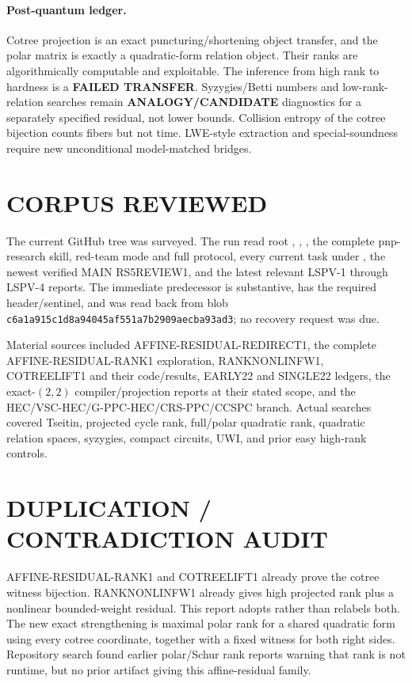 \documentclass[11pt]{article}
\begin{document}
\paragraph{Post-quantum ledger.}
Cotree projection is an exact puncturing/shortening object transfer, and the
polar matrix is exactly a quadratic-form relation object.  Their ranks are
algorithmically computable and exploitable.  The inference from high rank to
hardness is a \textbf{FAILED TRANSFER}.  Syzygies/Betti numbers and
low-rank-relation searches remain \textbf{ANALOGY/CANDIDATE} diagnostics for
a separately specified residual, not lower bounds.  Collision entropy of the
cotree bijection counts fibers but not time.  LWE-style extraction and
special-soundness require new unconditional model-matched bridges.

\section{CORPUS REVIEWED}
The current GitHub tree was surveyed.  The run read root ,
, , the complete pnp-research skill, red-team
mode and full protocol, every current task under , the newest
verified MAIN RS5REVIEW1, and the latest relevant LSPV-1 through LSPV-4
reports.  The immediate predecessor
is substantive, has the required header/sentinel, and was read back from blob
\texttt{c6a1a915c1d8a94045af551a7b2909aecba93ad3}; no recovery request was due.

Material sources included AFFINE-RESIDUAL-REDIRECT1, the complete
AFFINE-RESIDUAL-RANK1 exploration, RANKNONLINFW1, COTREELIFT1 and their
code/results, EARLY22 and SINGLE22 ledgers, the exact-$(2,2)$
compiler/projection reports at their stated scope, and the
HEC/VSC-HEC/G-PPC-HEC/CRS-PPC/CCSPC branch.  Actual searches covered Tseitin,
projected cycle rank, full/polar quadratic rank, quadratic relation spaces,
syzygies, compact circuits, UWI, and prior easy high-rank controls.

\section{DUPLICATION / CONTRADICTION AUDIT}
AFFINE-RESIDUAL-RANK1 and COTREELIFT1 already prove the cotree witness
bijection.  RANKNONLINFW1 already gives high projected rank plus a nonlinear
bounded-weight residual.  This report adopts rather than relabels both.  The
new exact strengthening is maximal polar rank for a shared quadratic form
using every cotree coordinate, together with a fixed witness for both right
sides.  Repository search found earlier polar/Schur rank reports warning that
rank is not runtime, but no prior artifact giving this affine-residual family.
\end{document}

